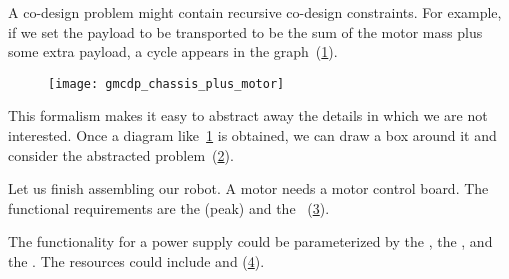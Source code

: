 \begin{example}

  A co-design problem might contain recursive co-design constraints.
  For example, if we set the payload to be transported to be the sum
  of the motor mass plus some extra payload, a cycle appears in the
  graph~(\cref{fig:gmcdp_chassis_plus_motor}).


  \begin{figure}[h]
    \centering{}\texttt{[image: gmcdp\_chassis\_plus\_motor]}
    \caption{\label{fig:gmcdp_chassis_plus_motor}}
  \end{figure}

  This formalism makes it easy to abstract away the details
  in which we are not interested. Once a diagram like~\cref{fig:gmcdp_chassis_plus_motor}
  is obtained, we can draw a box around it and consider the abstracted
  problem~(\cref{fig:gmcdp_chassis_plus_motor-1}).


  \begin{figure}[h!]
    \begin{center}
      \caption{\label{fig:gmcdp_chassis_plus_motor-1}}
    \end{center}
  \end{figure}


  \label{exa:finish}Let us finish assembling our robot. A motor needs
  a motor control board. The functional requirements are the (peak)
   and the ~(\cref{fig:mcb}).

  \begin{figure}[h]
    \centering
    \caption{\label{fig:mcb}}
  \end{figure}


  \noindent The functionality for a power supply could be parameterized
  by the , the , and the .
  The resources could include  and  (\cref{fig:example-ba}).

  \begin{figure}[h]
    \centering
    \caption{\label{fig:example-ba}}
  \end{figure}



\end{example}
